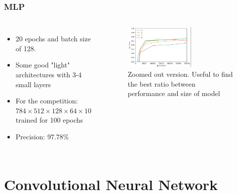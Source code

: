 \documentclass[aspectratio=169]{beamer}
\begin{document}
\begin{frame}[t]
    \frametitle{MLP}
    \begin{columns}

        \begin{itemize}
            \item 20 epochs and batch size of 128.
            \item Some good "light" architectures with 3-4 small layers
            \item For the competition: $784 \times 512 \times 128 \times 64 \times 10$ trained for 100 epochs
            \item Precision: 97.78\%
        \end{itemize}
        \begin{figure}[ht!]
            \centering
            \includegraphics[width=0.6\textwidth]{figures/mlp_layers.png}
            \caption{Zoomed out version. Useful to find the best ratio between performance and size of model}
            \label{fig:mlp_zoomed}
        \end{figure}
    \end{columns}
\end{frame}
\section{Convolutional Neural Network}
\end{document}
